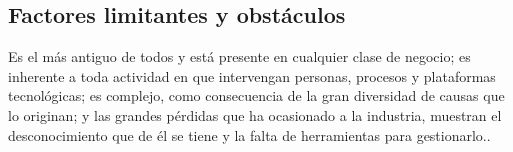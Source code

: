 \subsection{Factores limitantes y obstáculos}

Es el más antiguo de todos y está presente en cualquier clase de negocio; es inherente a toda actividad en que intervengan personas, procesos y plataformas tecnológicas; es complejo, como consecuencia de la gran diversidad de causas que lo originan; y las grandes pérdidas que ha ocasionado a la industria, muestran el desconocimiento que de él se tiene y la falta de herramientas para gestionarlo.\cite{Mora2010-ol}.